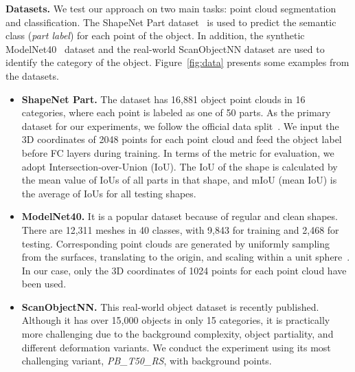 \documentclass[10pt,twocolumn,letterpaper]{article}
\begin{document}
\noindent \textbf{Datasets.}  We test our approach on two main tasks: point cloud segmentation and classification. The ShapeNet Part dataset~\cite{yi2016scalable} is used to predict the semantic class (\emph{part label}) for each point of the object. In addition, the synthetic ModelNet40~\cite{wu20153d} dataset and the real-world ScanObjectNN \cite{Uy_2019_ICCV} dataset are used to identify the category of the object. Figure~\ref{fig:data} presents some examples from the datasets.
\begin{itemize}
 \item \textbf{ShapeNet Part.} 
 The dataset has 16,881 object point clouds in 16 categories, where each point is labeled as one of 50 parts. As the primary dataset for our experiments, we follow the official data split~\cite{chang2015shapenet}. We input the 3D coordinates of 2048 points for each point cloud and feed the object label before FC layers during training. In terms of the metric for evaluation, we adopt Intersection-over-Union (\ie IoU). The IoU of the shape is calculated by the mean value of IoUs of all parts in that shape, and mIoU (\ie mean IoU) is the average of IoUs for all testing shapes.
 
 \item \textbf{ModelNet40.}  
 It is a popular dataset because of regular and clean shapes. There are 12,311 meshes in 40 classes, with 9,843 for training and 2,468 for testing. Corresponding point clouds are generated by uniformly sampling from the surfaces, translating to the origin, and scaling within a unit sphere~\cite{qi2017pointnet}. In our case, only the 3D coordinates of 1024 points for each point cloud have been used.
 
 \item \textbf{ScanObjectNN.} This real-world object dataset is recently published. Although it has over 15,000 objects in only 15 categories, it is practically more challenging due to the background complexity, object partiality, and different deformation variants. We conduct the experiment using its most challenging variant, \emph{PB\_T50\_RS}, with background points.
\end{itemize}
\end{document}
